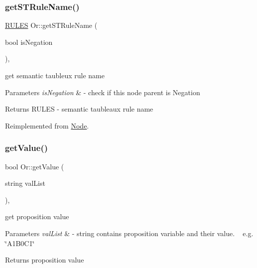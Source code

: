 \subsubsection{\texorpdfstring{get\+S\+T\+Rule\+Name()}{getSTRuleName()}}
{\footnotesize\ttfamily \hyperlink{proposition_2tableaux_2enum_8h_a70c93904c6a27d228050f922eb4fc3b8}{R\+U\+L\+ES} Or\+::get\+S\+T\+Rule\+Name (\begin{DoxyParamCaption}\item[{bool}]{is\+Negation }\end{DoxyParamCaption})\hspace{0.3cm}{\ttfamily [override]}, {\ttfamily [virtual]}}



get semantic taubleux rule name 


\begin{DoxyParams}{Parameters}
{\em is\+Negation} & -\/ check if this node parent is Negation \\
\hline
\end{DoxyParams}
\begin{DoxyReturn}{Returns}
R\+U\+L\+ES -\/ semantic taubleaux rule name 
\end{DoxyReturn}


Reimplemented from \hyperlink{class_node_a25b6581950988c2536a392a6874c8072}{Node}.

\mbox{\label{class_or_a9ede00ef8120ad4aee9f69049628ead9}} 
\subsubsection{\texorpdfstring{get\+Value()}{getValue()}}
{\footnotesize\ttfamily bool Or\+::get\+Value (\begin{DoxyParamCaption}\item[{string}]{val\+List }\end{DoxyParamCaption})\hspace{0.3cm}{\ttfamily [override]}, {\ttfamily [virtual]}}



get proposition value 


\begin{DoxyParams}{Parameters}
{\em val\+List} & -\/ string contains proposition variable and their value. ~\newline
 e.\+g. \char`\"{}\+A1\+B0\+C1\char`\"{} \\
\hline
\end{DoxyParams}
\begin{DoxyReturn}{Returns}
proposition value 
\end{DoxyReturn}


